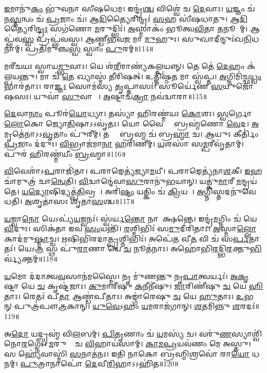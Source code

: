 \ul{𑌇}𑌮𑌾𑌨𑍁॑\ul{𑌕𑌂} 𑌭𑍁॑𑌵𑌨𑌾 𑌸𑍀𑌷𑌧𑍇𑌮। 𑌇𑌨𑍍𑌦𑍍𑌰॑\ul{𑌶𑍍𑌚} 𑌵𑌿𑌶𑍍𑌵𑍇॑ 𑌚 \ul{𑌦𑍇}𑌵𑌾𑌃। 
\ul{𑌯}𑌜𑍍𑌞𑌂 𑌚॑ 𑌨\ul{𑌸𑍍𑌤}𑌨𑍍𑌵𑌂 𑌚॑ \ul{𑌪𑍍𑌰}𑌜𑌾𑌂 𑌚॑। \ul{𑌆}\ul{𑌦𑌿}𑌤𑍍𑌯𑍈𑌰𑌿𑌨𑍍𑌦𑍍𑌰𑌃॑ \ul{𑌸}𑌹 𑌸𑍀॑𑌷𑌧𑌾𑌤𑍁। 
\ul{𑌆}\ul{𑌦𑌿}𑌤𑍍𑌯𑍈𑌰𑌿\ul{𑌨𑍍𑌦𑍍𑌰𑌃} 𑌸𑌗॑𑌣𑍋 \ul{𑌮}𑌰𑍁𑌦𑍍𑌭𑌿𑌃॑। \ul{𑌅}𑌸𑍍𑌮𑌾𑌕𑌂॑ 𑌭𑍂𑌤𑍍𑌵\ul{𑌵𑌿}𑌤𑌾 \ul{𑌤}𑌨𑍂𑌨𑌾᳚𑌮𑍍‌। 
𑌆𑌪𑍍𑌲॑𑌵\ul{𑌸𑍍𑌵} 𑌪𑍍𑌰𑌪𑍍𑌲॑𑌵𑌸𑍍𑌵। \ul{𑌆}𑌣𑍍𑌡𑍀𑌭॑𑌵\ul{𑌜} 𑌮𑌾 \ul{𑌮𑍁}𑌹𑍁𑌃। 
𑌸𑍁𑌖𑌾𑌦𑍀𑌨𑍍𑌦𑍁𑌃॑𑌖\ul{𑌨𑌿}𑌧𑌨𑌾𑌮𑍍‌। 𑌪𑍍𑌰𑌤𑌿॑𑌮𑍁𑌞𑍍𑌚\ul{𑌸𑍍𑌵} 𑌸𑍍𑌵𑌾𑌂 \ul{𑌪𑍁}𑌰𑌮𑍍‌॥114॥


𑌮𑌰𑍀॑𑌚𑌯𑌃 𑌸𑍍𑌵𑌾𑌯\ul{𑌮𑍍𑌭𑍁}𑌵𑌾𑌃। 𑌯𑍇 𑌶॑\ul{𑌰𑍀}𑌰𑌾𑌣𑍍𑌯॑𑌕𑌲𑍍𑌪𑌯𑌨𑍍𑌨𑍍‌। 
𑌤𑍇 𑌤𑍇॑ \ul{𑌦𑍇}𑌹𑌂 𑌕॑𑌲𑍍𑌪𑌯𑌨𑍍𑌤𑍁। 𑌮𑌾 𑌚॑ \ul{𑌤𑍇} 𑌖𑍍𑌯𑌾𑌸𑍍𑌮॑ 𑌤𑍀𑌰𑌿𑌷𑌤𑍍‌। 
𑌉𑌤𑍍𑌤𑌿॑𑌷𑍍𑌠\ul{𑌤} 𑌮𑌾 𑌸𑍍𑌵॑𑌪𑍍𑌤। \ul{𑌅}𑌗𑍍𑌨𑌿𑌮𑌿॑𑌚𑍍𑌛\ul{𑌧𑍍𑌵𑌂} 𑌭𑌾𑌰॑𑌤𑌾𑌃। 
𑌰𑌾\ul{𑌜𑍍𑌞𑌃} 𑌸𑍋𑌮॑𑌸𑍍𑌯 \ul{𑌤𑍃}𑌪𑍍𑌤𑌾𑌸𑌃॑। 𑌸𑍂𑌰𑍍𑌯𑍇॑𑌣 \ul{𑌸}𑌯𑍁𑌜𑍋॑𑌷𑌸𑌃। 
𑌯𑍁𑌵𑌾॑ \ul{𑌸𑍁}𑌵𑌾𑌸𑌾𑌃᳚। \ul{𑌅}𑌷𑍍𑌟𑌾𑌚॑\ul{𑌕𑍍𑌰𑌾} 𑌨𑌵॑𑌦𑍍𑌵𑌾𑌰𑌾॥115॥


\ul{𑌦𑍇}𑌵𑌾\ul{𑌨𑌾𑌂} 𑌪𑍂𑌰॑\ul{𑌯𑍋}𑌧𑍍𑌯𑌾। 𑌤𑌸𑍍𑌯𑌾॑ 𑌹𑌿𑌰𑌣𑍍𑌮॑𑌯𑌃 \ul{𑌕𑍋}𑌶𑌃। 
\ul{𑌸𑍍𑌵}𑌰𑍍𑌗𑍋 \ul{𑌲𑍋}𑌕𑍋 𑌜𑍍𑌯𑍋\ul{𑌤𑌿}𑌷𑌾𑌽𑌽𑌵𑍃॑𑌤𑌃। 𑌯𑍋 𑌵𑍈 𑌤𑌾𑌂᳚ 𑌬𑍍𑌰𑌹𑍍𑌮॑𑌣𑍋 \ul{𑌵𑍇}𑌦। 
\ul{𑌅}𑌮𑍃𑌤𑍇॑𑌨𑌾𑌽𑌽\ul{𑌵𑍃}𑌤𑌾𑌂 𑌪𑍁॑𑌰𑍀𑌮𑍍‌। 𑌤𑌸𑍍𑌮𑍈᳚ 𑌬𑍍𑌰𑌹𑍍𑌮 𑌚॑ 𑌬𑍍𑌰\ul{𑌹𑍍𑌮𑌾} 𑌚। 
\ul{𑌆}𑌯𑍁𑌃 𑌕𑍀𑌰𑍍𑌤𑌿𑌂॑ \ul{𑌪𑍍𑌰}𑌜𑌾𑌂 𑌦॑𑌦𑍁𑌃। \ul{𑌵𑌿}𑌭𑍍𑌰𑌾𑌜॑𑌮𑌾\ul{𑌨𑌾}\ul{} 𑌹𑌰𑌿॑𑌣𑍀𑌮𑍍‌। 
\ul{𑌯}𑌶𑌸𑌾॑ 𑌸\ul{𑌮𑍍𑌪}𑌰𑍀𑌵𑍃॑𑌤𑌾𑌮𑍍‌। 𑌪𑍁𑌰॑ 𑌹𑌿𑌰𑌣𑍍𑌮॑𑌯𑍀𑌂 \ul{𑌬𑍍𑌰}𑌹𑍍𑌮𑌾॥116॥


\ul{𑌵𑌿}𑌵𑍇𑌶𑌾॑𑌽\ul{𑌪}𑌰𑌾𑌜𑌿॑𑌤𑌾। 𑌪𑌰𑌾𑌙𑍇𑌤𑍍𑌯॑𑌜𑍍𑌯𑌾\ul{𑌮}𑌯𑍀। 
𑌪𑌰𑌾𑌙𑍇𑌤𑍍𑌯॑𑌨𑌾\ul{𑌶}𑌕𑍀। \ul{𑌇}𑌹 𑌚𑌾॑𑌮𑍁𑌤𑍍𑌰॑ 𑌚𑌾\ul{𑌨𑍍𑌵𑍇}𑌤𑌿। 
\ul{𑌵𑌿}𑌦𑍍𑌵𑌾𑌨𑍍𑌦𑍇॑𑌵𑌾\ul{𑌸𑍁}𑌰𑌾𑌨𑍁॑\ul{𑌭}𑌯𑌾𑌨𑍍‌। 𑌯𑌤𑍍𑌕𑍁॑\ul{𑌮𑌾}𑌰𑍀 \ul{𑌮}𑌨𑍍𑌦𑍍𑌰𑌯॑𑌤𑍇। 
\ul{𑌯}\ul{𑌦𑍍𑌯𑍋}𑌷𑌿𑌦𑍍𑌯𑌤𑍍𑌪॑\ul{𑌤𑌿}𑌵𑍍𑌰𑌤𑌾᳚। 𑌅𑌰𑌿॑\ul{𑌷𑍍𑌟𑌂} 𑌯𑌤𑍍𑌕𑌿𑌂 𑌚॑ \ul{𑌕𑍍𑌰𑌿}𑌯𑌤𑍇᳚। 
\ul{𑌅}𑌗𑍍𑌨𑌿𑌸𑍍𑌤𑌦𑌨𑍁॑𑌵𑍇𑌧𑌤𑌿। \ul{𑌅}𑌶𑍃𑌤𑌾॑𑌸𑌃 𑌶𑍃॑𑌤𑌾\ul{𑌸}𑌶𑍍𑌚॥117॥


\ul{𑌯}𑌜𑍍𑌵𑌾\ul{𑌨𑍋} 𑌯𑍇𑌽𑌪𑍍𑌯॑\ul{𑌯}𑌜𑍍𑌵𑌨𑌃॑। 𑌸𑍍𑌵॑𑌰𑍍𑌯\ul{𑌨𑍍𑌤𑍋} 𑌨𑌾𑌪𑍇᳚𑌕𑍍𑌷𑌨𑍍𑌤𑍇। 
𑌇𑌨𑍍𑌦𑍍𑌰॑\ul{𑌮}𑌗𑍍𑌨𑌿𑌂 𑌚॑ 𑌯𑍇 \ul{𑌵𑌿}𑌦𑍁𑌃। 𑌸𑌿𑌕॑𑌤𑌾 𑌇𑌵 \ul{𑌸𑌂}𑌯𑌨𑍍𑌤𑌿॑। 
\ul{𑌰}𑌶𑍍𑌮𑌿𑌭𑌿𑌃॑ 𑌸\ul{𑌮𑍁}𑌦𑍀𑌰𑌿॑𑌤𑌾𑌃। \ul{𑌅}𑌸𑍍𑌮𑌾\ul{𑌲𑍍𑌲𑍋}𑌕𑌾𑌦॑𑌮𑍁\ul{𑌷𑍍𑌮𑌾}𑌚𑍍𑌚। 
\ul{𑌋}𑌷𑌿𑌭𑌿॑𑌰𑌦𑌾\ul{𑌤𑍍𑌪𑍃}𑌶𑍍𑌨𑌿𑌭𑌿𑌃॑। 
𑌅𑌪𑍇॑\ul{𑌤} 𑌵𑍀\ul{𑌤} 𑌵𑌿 𑌚॑ 𑌸\ul{𑌰𑍍𑌪}𑌤𑌾𑌤𑌃॑। 𑌯𑍇𑌽\ul{𑌤𑍍𑌰} 𑌸𑍍𑌥 𑌪𑍁॑\ul{𑌰𑌾}𑌣𑌾 𑌯𑍇 \ul{𑌚} 𑌨𑍂𑌤॑𑌨𑌾𑌃। 
𑌅𑌹𑍋॑𑌭𑌿\ul{𑌰}𑌦𑍍𑌭𑌿\ul{𑌰}𑌕𑍍𑌤𑍁\-\ul{𑌭𑌿}𑌰𑍍𑌵𑍍𑌯॑𑌕𑍍𑌤𑌮𑍍‌॥118॥


\ul{𑌯}𑌮𑍋 𑌦॑𑌦𑌾𑌤𑍍𑌵\ul{𑌵}𑌸𑌾𑌨॑𑌮𑌸𑍍𑌮𑍈। 𑌨𑍃 𑌮𑍁॑𑌣𑌨𑍍𑌤𑍁 𑌨𑍃\ul{𑌪𑌾}𑌤𑍍𑌵𑌰𑍍𑌯𑌃॑। 
\ul{𑌅}\ul{𑌕𑍃}𑌷𑍍𑌟𑌾 𑌯𑍇 \ul{𑌚} 𑌕𑍃𑌷𑍍𑌟॑𑌜𑌾𑌃। \ul{𑌕𑍁}𑌮𑌾𑌰𑍀॑𑌷𑍁 \ul{𑌕}𑌨𑍀𑌨𑍀॑𑌷𑍁। 
\ul{𑌜𑌾}𑌰𑌿𑌣𑍀॑𑌷𑍁 \ul{𑌚} 𑌯𑍇 \ul{𑌹𑌿}𑌤𑌾𑌃। 𑌰𑍇𑌤𑌃॑ 𑌪𑍀\ul{𑌤𑌾} 𑌆𑌣𑍍𑌡॑𑌪𑍀𑌤𑌾𑌃। 
𑌅𑌙𑍍𑌗𑌾॑𑌰𑍇𑌷𑍁 \ul{𑌚} 𑌯𑍇 \ul{𑌹𑍁}𑌤𑌾𑌃। \ul{𑌉}𑌭𑌯𑌾᳚𑌨𑍍‌ 𑌪𑍁𑌤𑍍𑌰॑𑌪𑍗\ul{𑌤𑍍𑌰}𑌕𑌾𑌨𑍍‌। 
\ul{𑌯𑍁}\ul{𑌵𑍇}𑌽𑌹𑌂 \ul{𑌯}𑌮𑌰𑌾𑌜॑𑌗𑌾𑌨𑍍‌। \ul{𑌶}𑌤𑌮𑌿𑌨𑍍𑌨𑍁 \ul{𑌶}𑌰𑌦𑌃॑॥119॥


𑌅\ul{𑌦𑍋} 𑌯𑌦𑍍𑌬𑍍𑌰𑌹𑍍𑌮॑ 𑌵𑌿\ul{𑌲}𑌬𑌮𑍍‌। \ul{𑌪𑌿}\ul{𑌤𑍃}𑌣𑌾𑌂 𑌚॑ \ul{𑌯}𑌮𑌸𑍍𑌯॑ 𑌚। 
𑌵𑌰𑍁॑\ul{𑌣}𑌸𑍍𑌯𑌾𑌶𑍍𑌵𑌿॑𑌨𑍋\ul{𑌰}𑌗𑍍𑌨𑍇𑌃। \ul{𑌮}𑌰𑍁𑌤𑌾𑌂᳚ 𑌚 \ul{𑌵𑌿}𑌹𑌾𑌯॑𑌸𑌾𑌮𑍍‌। 
\ul{𑌕𑌾}\ul{𑌮}\ul{𑌪𑍍𑌰}𑌯𑌵॑𑌣𑌂 𑌮𑍇 𑌅𑌸𑍍𑌤𑍁। 𑌸 𑌹𑍍𑌯𑍇॑𑌵𑌾𑌸𑍍𑌮𑌿॑ \ul{𑌸}𑌨𑌾𑌤॑𑌨𑌃। 
𑌇𑌤𑌿 𑌨𑌾𑌕𑍋 𑌬𑍍𑌰𑌹𑍍𑌮𑌿𑌶𑍍𑌰𑌵𑍋॑ 𑌰𑌾\ul{𑌯𑍋} 𑌧𑌨𑌮𑍍‌। \ul{𑌪𑍁}𑌤𑍍𑌰𑌾𑌨𑌾𑌪𑍋॑ \ul{𑌦𑍇}𑌵𑍀\ul{𑌰𑌿}𑌹𑌾𑌽𑌽𑌹𑌿॑𑌤॥120॥\anuvakamend



